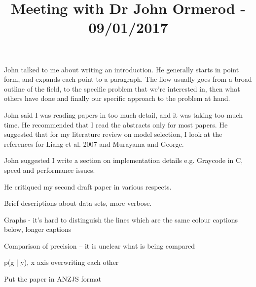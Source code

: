 \documentclass{amsart}
\title{Meeting with Dr John Ormerod - 09/01/2017}
\begin{document}
\maketitle

John talked to me about writing an introduction. He generally starts in point form, and expands each point
to a paragraph. The flow usually goes from a broad outline of the field, to the specific problem that we're
interested in, then what others have done and finally our specific approach to the problem at hand.

John said I was reading papers in too much detail, and it was taking too much time. He recommended that I read
the abstracts only for most papers. He suggested that for my literature review on model selection, I look
at the references for Liang et al. 2007 and Murayama and George.

John suggested I write a section on implementation details e.g. Graycode in C, speed and performance issues.

He critiqued my second draft paper in various respects.

Brief descriptions about data sets, more verbose.

Graphs - it's hard to distinguish the lines which are the same colour
captions below, longer captions

Comparison of precision -- it is unclear what is being compared

p(g | y), x axis overwriting each other

Put the paper in ANZJS format
\end{document}
